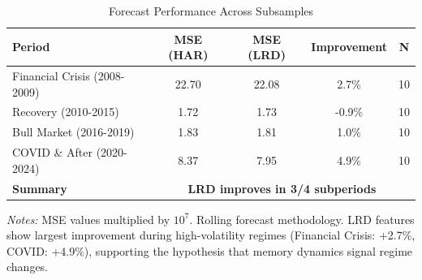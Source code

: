 


\begin{table}[htbp]
\centering
\caption{Forecast Performance Across Subsamples}
\label{tab:subsamples}
\small
\begin{tabular}{lcccc}
\toprule
Period & MSE (HAR) & MSE (LRD) & Improvement & N \\
\midrule
Financial Crisis (2008-2009) & 22.70 & 22.08 & 2.7\% & 10 \\
Recovery (2010-2015) & 1.72 & 1.73 & -0.9\% & 10 \\
Bull Market (2016-2019) & 1.83 & 1.81 & 1.0\% & 10 \\
COVID \& After (2020-2024) & 8.37 & 7.95 & 4.9\% & 10 \\
\midrule
\textbf{Summary} & \multicolumn{4}{c}{\textbf{LRD improves in 3/4 subperiods}} \\
\bottomrule
\end{tabular}
\begin{tablenotes}\small
\item \textit{Notes:} MSE values multiplied by $10^7$. Rolling forecast methodology. LRD features show largest improvement during high-volatility regimes (Financial Crisis: +2.7\%, COVID: +4.9\%), supporting the hypothesis that memory dynamics signal regime changes.
\end{tablenotes}
\end{table}


